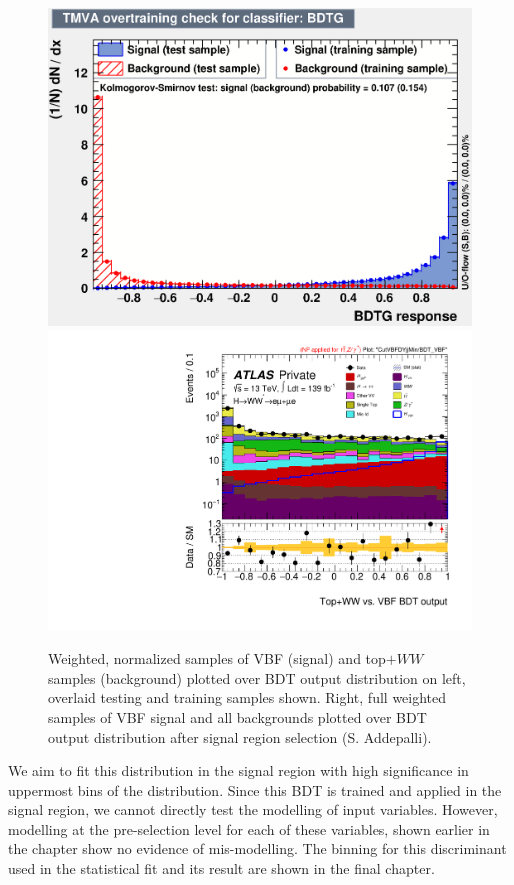 \begin{figure}[!htbp]
\centering
  \includegraphics[width=.45\linewidth]{Pictures/VBFvsWW+Top/overtrain_BDTG.eps}
  \includegraphics[width=.35\linewidth]{Pictures/run2-emme-CutVBFDYjjMin-BDT_VBF-log.pdf}
\caption{Weighted, normalized samples of VBF (signal) and top$+WW$ samples (background) plotted over BDT output distribution on left, overlaid testing and training samples shown. Right, full weighted samples of VBF signal and all backgrounds plotted over BDT output distribution after signal region selection (S. Addepalli).}
\label{fig:SRBDTresult}
\end{figure}

We aim to fit this distribution in the signal region with high significance in uppermost bins of the distribution. Since this BDT is trained and applied in the signal region, we cannot directly test the modelling of input variables. However, modelling at the pre-selection level for each of these variables, shown earlier in the chapter show no evidence of mis-modelling. The binning for this discriminant used in the statistical fit and its result are shown in the final chapter. 

